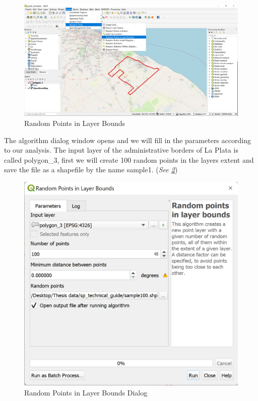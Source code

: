 \documentclass[
]{book}
\begin{document}
\begin{figure}

{\centering \includegraphics[width=1\linewidth]{images/spatialpoints} 

}

\caption{Random Points in Layer Bounds}\label{fig:img-198}
\end{figure}

The algorithm dialog window opens and we will fill in the parameters according to our analysis. The input layer of the administrative borders of La Plata is called {polygon\_3}, first we will create 100 random points in the layers extent and save the file as a shapefile by the name {sample1}. (\emph{See \ref{fig:img-199}})

\begin{figure}

{\centering \includegraphics[width=0.7\linewidth]{images/spatialpoints2} 

}

\caption{Random Points in Layer Bounds Dialog}\label{fig:img-199}
\end{figure}
\end{document}
